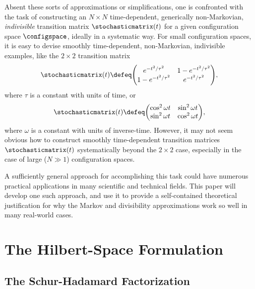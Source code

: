 \documentclass[12pt,english,prl,superscriptaddress,nobibnotes,nofootinbib]{revtex4-2}
\let\originalleft\left
\let\originalright\right
\renewcommand{\left}{\mathopen{}\mathclose\bgroup\originalleft}
\renewcommand{\right}{\aftergroup\egroup\originalright}
\begin{document}
Absent these sorts of approximations or simplifications, one is confronted
with the task of constructing an $N\times N$ time-dependent, generically
non-Markovian, \emph{indivisible} transition matrix $\stochasticmatrix\left(t\right)$
for a given configuration space $\configspace$, ideally in a systematic
way. For small configuration spaces, it is easy to devise smoothly
time-dependent, non-Markovian, indivisible examples, like the $2\times2$
transition matrix 
\begin{equation}
\stochasticmatrix\left(t\right)\defeq\begin{pmatrix}e^{-t^{2}/\tau^{2}} & 1-e^{-t^{2}/\tau^{2}}\\
1-e^{-t^{2}/\tau^{2}} & e^{-t^{2}/\tau^{2}}
\end{pmatrix},\label{eq:DefSimple2x2ExponentialStochasticMatrix}
\end{equation}
 where $\tau$ is a constant with units of time, or 
\begin{equation}
\stochasticmatrix\left(t\right)\defeq\begin{pmatrix}\cos^{2}\omega t & \sin^{2}\omega t\\
\sin^{2}\omega t & \cos^{2}\omega t
\end{pmatrix},\label{eq:DefSimple2x2SinusoidalStochasticMatrix}
\end{equation}
 where $\omega$ is a constant with units of inverse-time. However,
it may not seem obvious how to construct smoothly time-dependent transition
matrices $\stochasticmatrix\left(t\right)$ systematically beyond
the $2\times2$ case, especially in the case of large ($N\gg1$) configuration
spaces.

A sufficiently general approach for accomplishing this task could
have numerous practical applications in many scientific and technical
fields. This paper will develop one such approach, and use it to provide
a self-contained theoretical justification for why the Markov and
divisibility approximations work so well in many real-world cases.

\section{The Hilbert-Space Formulation\label{sec:The-Hilbert-Space-Formulation}}

\subsection{The Schur-Hadamard Factorization\label{subsec:The-Schur-Hadamard-Factorization}}
\end{document}
